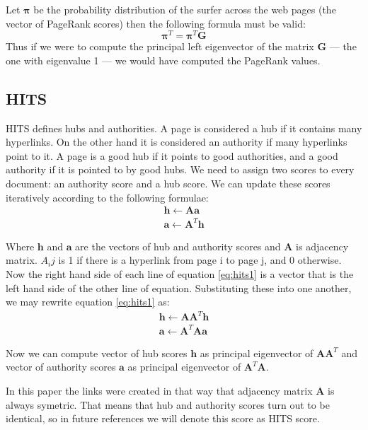 \documentclass[10pt, a4paper]{article}
\begin{document}
Let $\boldsymbol{\pi}$ be the probability distribution of the surfer across the web pages (the vector of PageRank scores) then the following formula must be valid:
$$
\boldsymbol{\pi}^T = \boldsymbol{\pi}^T \mathbf{G}
$$
Thus if we were to compute the principal left eigenvector of the matrix \textbf{G} — the one with eigenvalue 1 — we would have computed the PageRank values.

\subsection{HITS}
HITS defines hubs and authorities. A page is considered a hub if it contains many hyperlinks. On the other hand it is considered an authority if many hyperlinks point to it. A page is a good hub if it points to good authorities, and a good authority if it is pointed to by good hubs. We need to assign two scores to every document: an authority score and a hub score. We can update these scores iteratively according to the following formulae:
\begin{equation}
  \label {eq:hits1}
\begin{gathered} 
\mathbf{h} \leftarrow \mathbf{A}\mathbf{a} \\
\mathbf{a} \leftarrow \mathbf{A}^T\mathbf{h} 
\end{gathered}
\end{equation}

Where $\mathbf{h}$ and $\mathbf{a}$ are the vectors of hub and authority scores and $\mathbf{A}$ is adjacency matrix. $A_ij$ 
is 1 if there is a hyperlink from page i to page j, and 0 otherwise.
Now the right hand side of each line of equation \ref{eq:hits1} is a vector that is the left hand side of the other line of equation.
Substituting these into one another, we may rewrite equation \ref{eq:hits1} as:
\begin{equation}
  \label {eq:hits2}
\begin{gathered} 
\mathbf{h} \leftarrow \mathbf{A}\mathbf{A}^T\mathbf{h} \\
\mathbf{a} \leftarrow \mathbf{A}^T\mathbf{A}\mathbf{a} 
\end{gathered}
\end{equation}

Now we can compute vector of hub scores $\mathbf{h}$ as principal eigenvector of $\mathbf{A}\mathbf{A}^T$ and vector of authority
scores $\mathbf{a}$ as principal
eigenvector of $\mathbf{A}^T\mathbf{A}$.

In this paper the links were created in that way that adjacency matrix $\mathbf{A}$ is always symetric. That means that hub and authority scores
turn out to be identical, so in future references we will denote this score as HITS score.
\end{document}
